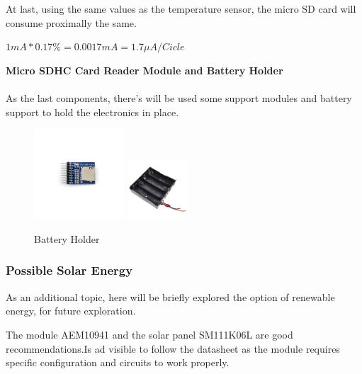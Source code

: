 At last, using the same values as the temperature sensor, the micro SD card will consume proximally the same.

\(1mA*0.17\% = 0.0017mA = 1.7 \mu A/Cicle \)

\textbf{Micro SDHC Card Reader Module and Battery Holder}\\\\
As the last components, there's will be used some support modules and battery 
support to hold the electronics in place.

\begin{figure}[H]
    \centering
    \includegraphics[width=0.3\textwidth]{images/chapter/design/components/sd_support.jpg}  %
    \label{fig:Módulo leitor de cartões micro SD}        
    \hspace{0.1cm}
    \includegraphics[width=0.2\textwidth]{images/chapter/design/components/battery-holder.jpg}  %
    \caption{Battery Holder}
    \label{fig:Battery Holder}        
\end{figure}




\subsubsection{Possible Solar Energy}
As an additional topic, here will be briefly explored the option of renewable
energy, for future exploration.

The module AEM10941 and the solar panel SM111K06L are good recommendations.Is ad
visible to follow the datasheet as the module requires specific configuration and circuits 
to work properly.


